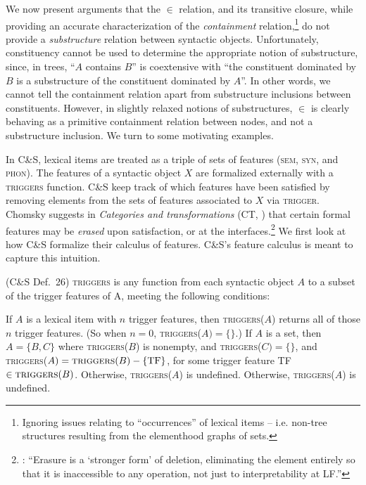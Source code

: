 \documentclass[output=paper]{langsci/langscibook}
\begin{document}
We now present arguments that the $\in$ relation, and its transitive closure,
while providing an accurate characterization of the \emph{containment}
relation,\footnote{Ignoring issues relating to \enquote{occurrences} of lexical
items -- i.e. non-tree structures resulting from the elementhood graphs of
sets.} do not pro\-vide a \emph{substructure} relation between syntactic
objects.  Unfortunately, constituency cannot be used to determine the
appropriate notion of substructure, since, in trees, \enquote{$A$ contains $B$}
is coextensive with ``the constituent dominated by $B$ is a substructure of the
constituent dominated by $A$''. In other words, we cannot tell the containment
relation apart from substructure inclusions between constituents. However, in
slightly relaxed notions of substructures, $\in$ is clearly behaving as a
primitive containment relation between nodes, and not a substructure inclusion.
We turn to some motivating examples.

In C\&S, lexical items are treated as a triple of sets of
features (\textsc{sem}, \textsc{syn}, and \textsc{phon}).  The features of a
syntactic object $X$ are formalized externally with a \textsc{triggers}
function. C\&S keep track of which features have been
satisfied by removing elements from the sets of features associated to $X$ via
\textsc{trigger}. Chomsky suggests in \emph{Categories and transformations} (CT,
\citeyear[Chapter 4]{Chomsky1995}) that
certain formal features may be \emph{erased} upon satisfaction, or at the
interfaces.\footnote{\citet[280]{Chomsky1995}: \enquote{Erasure is a `stronger
form' of deletion, eliminating the element entirely so that it is inaccessible
to any operation, not just to interpretability at \gls{LF}.}} We first look at how
C\&S formalize their calculus of features.
C\&S's feature calculus is meant to capture this intuition.

\ea\label{ex:33.24}(C\&S Def.\ 26) \textsc{triggers} is any
function from each syntactic object $A$ to a subset of the trigger features of
A, meeting the following conditions:
    \begin{xlisti}
        \ex   If $A$ is a lexical item with $n$ trigger features, then
        \textsc{triggers}($A$) returns all of those $n$ trigger features. (So when
        $n=0$, \textsc{triggers}($A)=\{\}$.)
        \ex If $A$ is a set, then $A=\{B,C\}$ where \textsc{triggers}($B$)
        is nonempty, and \textsc{triggers}($C)=\{\}$, and
        \textsc{triggers}($A)=\textsc{triggers}(B)-\{\text{TF}\}$, for some trigger
        feature TF $\in \textsc{triggers}(B)$.  Otherwise, \textsc{triggers}($A$)
        is undefined.
        \ex Otherwise, \textsc{triggers}($A$) is undefined.
    \end{xlisti}
\z
\end{document}

